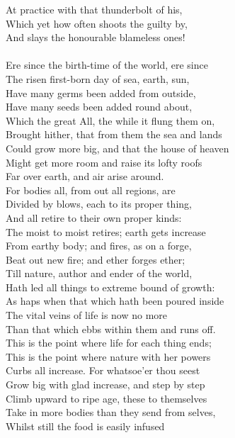At practice with that thunderbolt of his,\\
Which yet how often shoots the guilty by,\\
And slays the honourable blameless ones!\\
\\
Ere since the birth-time of the world, ere since\\
The risen first-born day of sea, earth, sun,\\
Have many germs been added from outside,\\
Have many seeds been added round about,\\
Which the great All, the while it flung them on,\\
Brought hither, that from them the sea and lands\\
Could grow more big, and that the house of heaven\\
Might get more room and raise its lofty roofs\\
Far over earth, and air arise around.\\
For bodies all, from out all regions, are\\
Divided by blows, each to its proper thing,\\
And all retire to their own proper kinds:\\
The moist to moist retires; earth gets increase\\
From earthy body; and fires, as on a forge,\\
Beat out new fire; and ether forges ether;\\
Till nature, author and ender of the world,\\
Hath led all things to extreme bound of growth:\\
As haps when that which hath been poured inside\\
The vital veins of life is now no more\\
Than that which ebbs within them and runs off.\\
This is the point where life for each thing ends;\\
This is the point where nature with her powers\\
Curbs all increase. For whatsoe'er thou seest\\
Grow big with glad increase, and step by step\\
Climb upward to ripe age, these to themselves\\
Take in more bodies than they send from selves,\\
Whilst still the food is easily infused\\
